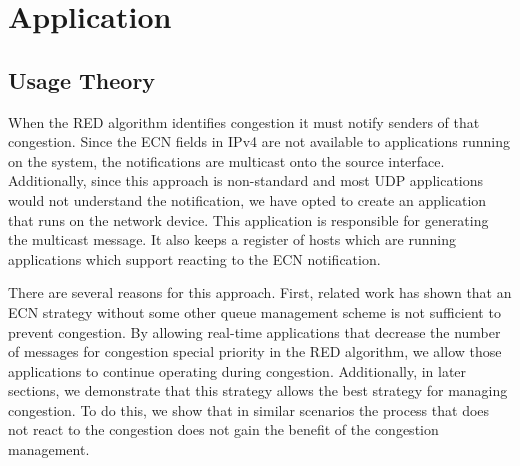 
\section{Application}

\subsection{Usage Theory}
When the RED algorithm identifies congestion it must notify senders of that congestion.
Since the ECN fields in IPv4 are not available to applications running on the system, the notifications are multicast onto the source interface.
Additionally, since this approach is non-standard and most UDP applications would not understand the notification, we have opted to create an application that runs on the network device.
This application is responsible for generating the multicast message.
It also keeps a register of hosts which are running applications which support reacting to the ECN notification.

There are several reasons for this approach.
First, related work has shown that an ECN strategy without some other queue management scheme is not sufficient to prevent congestion.
By allowing real-time applications that decrease the number of messages for congestion special priority in the RED algorithm, we allow those applications to continue operating during congestion.
Additionally, in later sections, we demonstrate that this strategy allows the best strategy for managing congestion.
To do this, we show that in similar scenarios the process that does not react to the congestion does not gain the benefit of the congestion management.

